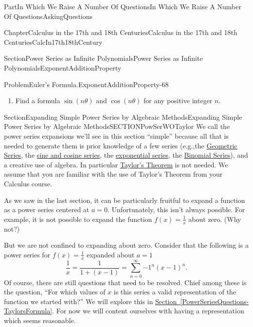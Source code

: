 \documentclass[oneside,10pt,]{book}
\newcommand{\xreffont}{\relax}
\numberwithin{equation}{part}
\begin{document}
\begin{partptx}{Part}{In Which We Raise A Number Of Questions}{}{In Which We Raise A Number Of Questions}{}{}{AskingQuestions}
\begin{chapterptx}{Chapter}{Calculus in the 17th and 18th Centuries}{}{Calculus in the 17th and 18th Centuries}{}{}{CalcIn17th18thCentury}
\begin{sectionptx}{Section}{Power Series as Infinite Polynomials}{}{Power Series as Infinite Polynomials}{}{}{ExponentAdditionProperty}
\begin{problem}{Problem}{Euler's Formula.}{ExponentAdditionProperty-68}
\begin{enumerate}[font=\bfseries,label=(\alph*),ref=\alph*]
\begin{equation*}
\end{equation*}
%
\begin{equation*}
\cos 3\theta=\cos^3\theta-3\cos\theta\sin^2\theta
\end{equation*}
%
\item{}Find a formula \(\sin(n\theta)\) and \(\cos(n\theta)\) for any positive integer \(n\).%
\end{enumerate}%
\end{problem}
\end{sectionptx}
%
%
\typeout{************************************************}
\typeout{************************************************}
%
\begin{sectionptx}{Section}{Expanding Simple Power Series by Algebraic Methods}{}{Expanding Simple Power Series by Algebraic Methods}{}{}{SECTIONPowSerWOTaylor}
We call the power series expansions we'll see in this section ``simple'' because all that is needed to generate them is prior knowledge of a few series (e.g.,the \hyperref[EQUATIONGeometricSeries]{Geometric Series}, the \hyperref[PROBLEMSinCosPwrSeries]{sine and cosine series}, the \hyperref[EQUATIONExpSeries]{exponential series}, the \hyperref[eq_BinomialSeries]{Binomial Series}), and a creative use of algebra. In particular \hyperref[TaylorsTheorem]{Taylor's Theorem} is not needed. We assume that you are familiar with the use of Taylor's Theorem from your Calculus course.%
\par
As we saw in the last section, it can be particularly fruitful to expand a function as a power series centered at \(a=0\). Unfortunately, this isn't always possible. For example, it is not possible to expand the function \(f\left(x\right)=\frac{1}{x}\) about zero. (Why not?)%
\par
But we are not confined to expanding about zero.  Consider that the following is a power series for \(f(x)=\frac{1}{x}\) expanded about \(a=1\)%
\begin{equation*}
\frac{1}{x}=\frac{1}{1+\left(x-1\right)}=\sum^{\infty}_{n=0}{-1^n{\left(x-1\right)}^n}\text{.}
\end{equation*}
Of course, there are still questions that need to be resolved. Chief among these is the question, ``For which values of \(x\) is this series a valid representation of the function we started with?'' We will explore this in \hyperref[PowerSeriesQuestions-TaylorsFormula]{Section~{\xreffont\ref{PowerSeriesQuestions-TaylorsFormula}}}. For now we will content ourselves with having a representation which seems reasonable.%

\end{sectionptx}
\end{chapterptx}
\end{partptx}
\end{document}
